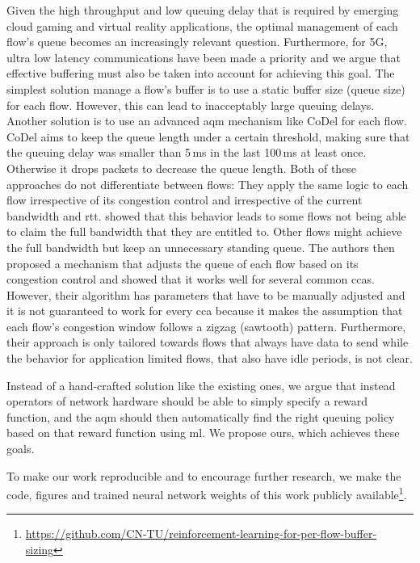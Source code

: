 \documentclass[conference]{IEEEtran}
\begin{document}
Given the high throughput and low queuing delay that is required by emerging cloud gaming \cite{jarschel_evaluation_2011} and virtual reality \cite{elbamby_toward_2018} applications, the optimal management of each flow's queue becomes an increasingly relevant question. Furthermore, for 5G, ultra low latency communications have been made a priority \cite{li_5g_2018} and we argue that effective buffering must also be taken into account for achieving this goal. The simplest solution manage a flow's buffer is to use a static buffer size (queue size) for each flow. However, this can lead to inacceptably large queuing delays. Another solution is to use an advanced \gls{aqm} mechanism like CoDel for each flow. CoDel aims to keep the queue length under a certain threshold, making sure that the queuing delay was smaller than 5\,ms in the last 100\,ms at least once. Otherwise it drops packets to decrease the queue length. Both of these approaches do not differentiate between flows: They apply the same logic to each flow irrespective of its congestion control and irrespective of the current bandwidth and \gls{rtt}. \cite{bachl_cocoa_2019} showed that this behavior leads to some flows not being able to claim the full bandwidth that they are entitled to. Other flows might achieve the full bandwidth but keep an unnecessary standing queue. The authors then proposed a mechanism that adjusts the queue of each flow based on its congestion control and showed that it works well for several common \glspl{cca}. However, their algorithm has parameters that have to be manually adjusted and it is not guaranteed to work for every \gls{cca} because it makes the assumption that each flow's congestion window follows a zigzag (sawtooth) pattern. Furthermore, their approach is only tailored towards flows that always have data to send while the behavior for application limited flows, that also have idle periods, is not clear. 

Instead of a hand-crafted solution like the existing ones, we argue that instead operators of network hardware should be able to simply specify a reward function, and the \gls{aqm} should then automatically find the right queuing policy based on that reward function using \gls{ml}. We propose \gls{ours}, which achieves these goals. 

To make our work reproducible and to encourage further research, we make the code, figures and trained neural network weights of this work publicly available\footnote{\scriptsize\url{https://github.com/CN-TU/reinforcement-learning-for-per-flow-buffer-sizing}}. 
\end{document}
